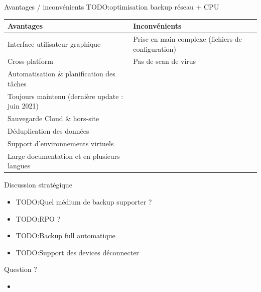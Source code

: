 \documentclass[aspectratio=169]{beamer}
\newcommand{\TODO}{TODO:}
\begin{document}
\begin{frame}{Avantages / inconvénients}
 \TODO optimisation backup réseau + CPU
    \begin{center}
     \begin{tabular}{|l|l|}
     \hline
      \textbf{Avantages} & \textbf{Inconvénients} \\
     \hline
     \hline
        Interface utilisateur graphique & Prise en main complexe (fichiers de configuration) \\
     \hline
      Cross-platform & Pas de scan de virus\\
     \hline
      Automatisation \& planification des tâches \\
     \hline
     Toujours maintenu (dernière update : juin 2021) \\
     \hline
     Sauvegarde Cloud \& hors-site & \\
     \hline
     Déduplication des données & \\
     \hline
     Support d'environnements virtuels & \\
     \hline
     Large documentation et en plusieurs langues & \\
     \hline
     \end{tabular}

    \end{center}

\end{frame}

\begin{frame}{Discussion stratégique}
 \begin{itemize}
  \item \TODO Quel médium de backup supporter ?
  \item \TODO RPO ?
  \item \TODO Backup full automatique
  \item \TODO Support des devices déconnecter
 \end{itemize}
\end{frame}

\begin{frame}{Question ?}
 \begin{itemize}
  \item 
 \end{itemize}
\end{frame}
\end{document}
